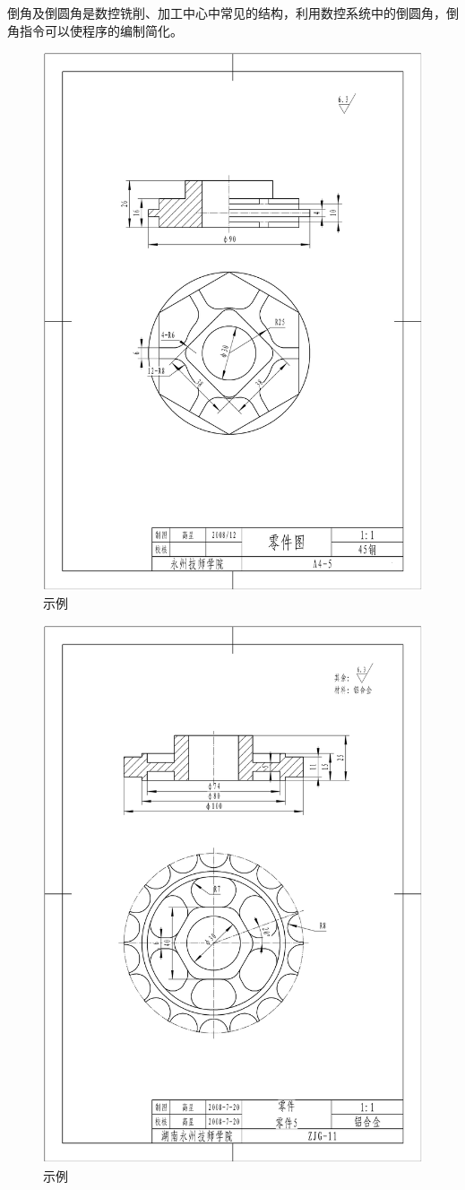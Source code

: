 倒角及倒圆角是数控铣削、加工中心中常见的结构，利用数控系统中的倒圆角，倒角指令可以使程序的编制简化。
\begin{figure}[h]
	\centering
	\includegraphics[width=0.8\linewidth,trim=100 200 100  200,clip]{data/image/28-1}
	\caption{示例}
	\label{fig:28-1}
\end{figure}

\begin{figure}[h]
	\centering
	\includegraphics[width=0.8\linewidth,trim=100 200 100  150,clip]{data/image/28-2}
	\caption{示例}
	\label{fig:28-2}
\end{figure}

